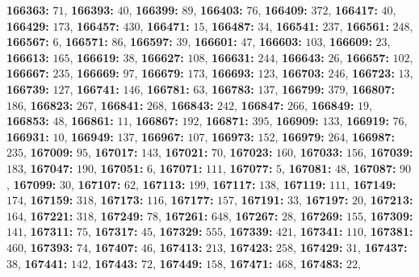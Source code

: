 \textsf{\bfseries 166363:} $71$, \textsf{\bfseries 166393:} $40$, \textsf{\bfseries 166399:} $89$, \textsf{\bfseries 166403:} $76$, \textsf{\bfseries 166409:} $372$, \textsf{\bfseries 166417:} $40$, \textsf{\bfseries 166429:} $173$, \textsf{\bfseries 166457:} $430$, \textsf{\bfseries 166471:} $15$, \textsf{\bfseries 166487:} $34$, \textsf{\bfseries 166541:} $237$, \textsf{\bfseries 166561:} $248$, \textsf{\bfseries 166567:} $6$, \textsf{\bfseries 166571:} $86$, \textsf{\bfseries 166597:} $39$, \textsf{\bfseries 166601:} $47$, \textsf{\bfseries 166603:} $103$, \textsf{\bfseries 166609:} $23$, \textsf{\bfseries 166613:} $165$, \textsf{\bfseries 166619:} $38$, \textsf{\bfseries 166627:} $108$, \textsf{\bfseries 166631:} $244$, \textsf{\bfseries 166643:} $26$, \textsf{\bfseries 166657:} $102$, \textsf{\bfseries 166667:} $235$, \textsf{\bfseries 166669:} $97$, \textsf{\bfseries 166679:} $173$, \textsf{\bfseries 166693:} $123$, \textsf{\bfseries 166703:} $246$, \textsf{\bfseries 166723:} $13$, \textsf{\bfseries 166739:} $127$, \textsf{\bfseries 166741:} $146$, \textsf{\bfseries 166781:} $63$, \textsf{\bfseries 166783:} $137$, \textsf{\bfseries 166799:} $379$, \textsf{\bfseries 166807:} $186$, \textsf{\bfseries 166823:} $267$, \textsf{\bfseries 166841:} $268$, \textsf{\bfseries 166843:} $242$, \textsf{\bfseries 166847:} $266$, \textsf{\bfseries 166849:} $19$, \textsf{\bfseries 166853:} $48$, \textsf{\bfseries 166861:} $11$, \textsf{\bfseries 166867:} $192$, \textsf{\bfseries 166871:} $395$, \textsf{\bfseries 166909:} $133$, \textsf{\bfseries 166919:} $76$, \textsf{\bfseries 166931:} $10$, \textsf{\bfseries 166949:} $137$, \textsf{\bfseries 166967:} $107$, \textsf{\bfseries 166973:} $152$, \textsf{\bfseries 166979:} $264$, \textsf{\bfseries 166987:} $235$, \textsf{\bfseries 167009:} $95$, \textsf{\bfseries 167017:} $143$, \textsf{\bfseries 167021:} $70$, \textsf{\bfseries 167023:} $160$, \textsf{\bfseries 167033:} $156$, \textsf{\bfseries 167039:} $183$, \textsf{\bfseries 167047:} $190$, \textsf{\bfseries 167051:} $6$, \textsf{\bfseries 167071:} $111$, \textsf{\bfseries 167077:} $5$, \textsf{\bfseries 167081:} $48$, \textsf{\bfseries 167087:} $90$, \textsf{\bfseries 167099:} $30$, \textsf{\bfseries 167107:} $62$, \textsf{\bfseries 167113:} $199$, \textsf{\bfseries 167117:} $138$, \textsf{\bfseries 167119:} $111$, \textsf{\bfseries 167149:} $174$, \textsf{\bfseries 167159:} $318$, \textsf{\bfseries 167173:} $116$, \textsf{\bfseries 167177:} $157$, \textsf{\bfseries 167191:} $33$, \textsf{\bfseries 167197:} $20$, \textsf{\bfseries 167213:} $164$, \textsf{\bfseries 167221:} $318$, \textsf{\bfseries 167249:} $78$, \textsf{\bfseries 167261:} $648$, \textsf{\bfseries 167267:} $28$, \textsf{\bfseries 167269:} $155$, \textsf{\bfseries 167309:} $141$, \textsf{\bfseries 167311:} $75$, \textsf{\bfseries 167317:} $45$, \textsf{\bfseries 167329:} $555$, \textsf{\bfseries 167339:} $421$, \textsf{\bfseries 167341:} $110$, \textsf{\bfseries 167381:} $460$, \textsf{\bfseries 167393:} $74$, \textsf{\bfseries 167407:} $46$, \textsf{\bfseries 167413:} $213$, \textsf{\bfseries 167423:} $258$, \textsf{\bfseries 167429:} $31$, \textsf{\bfseries 167437:} $38$, \textsf{\bfseries 167441:} $142$, \textsf{\bfseries 167443:} $72$, \textsf{\bfseries 167449:} $158$, \textsf{\bfseries 167471:} $468$, \textsf{\bfseries 167483:} $22$, 
